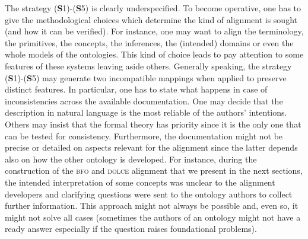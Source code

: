 \documentclass[ao]{iosart2x}
\newcommand{\dolce}{{\textsc{dolce}}}
\newcommand{\bfo}{{\textsc{bfo}}}
\begin{document}
The strategy ({\bf S}1)-({\bf S}5) is clearly underspecified. To become operative, one has to give the methodological choices which determine the kind of alignment is sought (and how it can be verified). For instance, one may want to align the terminology, the primitives, the concepts, the inferences, the (intended) domains or even the whole models of the ontologies. This kind of choice leads to pay attention to some features of these systems leaving aside others. Generally speaking, the strategy ({\bf S}1)-({\bf S}5) may generate two incompatible mappings when applied to preserve distinct features.
In particular, one has to state what happens in case of inconsistencies across the available documentation. One may decide that the description in natural language is the most reliable of the authors' intentions. Others may insist that the formal theory has priority since it is the only one that can be tested for consistency. Furthermore, the documentation might not be precise or detailed on aspects relevant for the alignment since the latter depends also on how the other ontology is developed. For instance, during the construction of the {\bfo} and {\dolce} alignment that we present in the next sections, the intended interpretation of some concepts was unclear to the alignment developers and clarifying questions were sent to the ontology authors to collect further information. This approach might not always be possible and, even so, it might not solve all cases (sometimes the authors of an ontology might not have a ready answer especially if the question raises foundational problems). %
\end{document}
